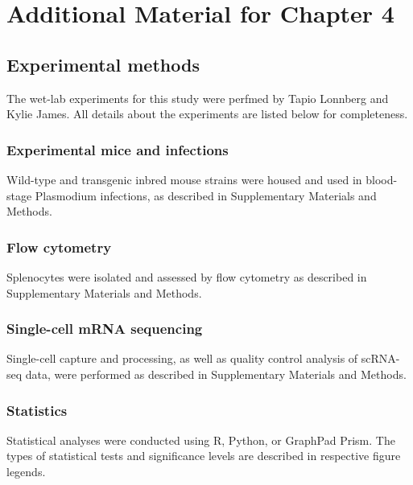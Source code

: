 
\chapter{Additional Material for Chapter 4}

\graphicspath{{Appendix3/Figs/}}

\section{Experimental methods} \label{sec:malaria-methods}

The wet-lab experiments for this study were perfmed by Tapio Lonnberg and Kylie James. All details about the experiments are listed below for completeness.

\subsection{Experimental mice and infections}

Wild-type and transgenic inbred mouse strains were housed and used in blood-stage Plasmodium infections, as described in Supplementary Materials and Methods.

\subsection{Flow cytometry}

Splenocytes were isolated and assessed by flow cytometry as described in Supplementary Materials and Methods.

\subsection{Single-cell mRNA sequencing}

Single-cell capture and processing, as well as quality control analysis of scRNA-seq data, were performed as described in Supplementary Materials and Methods.

\subsection{Statistics}

Statistical analyses were conducted using R, Python, or GraphPad Prism. The types of statistical tests and significance levels are described in respective figure legends.

